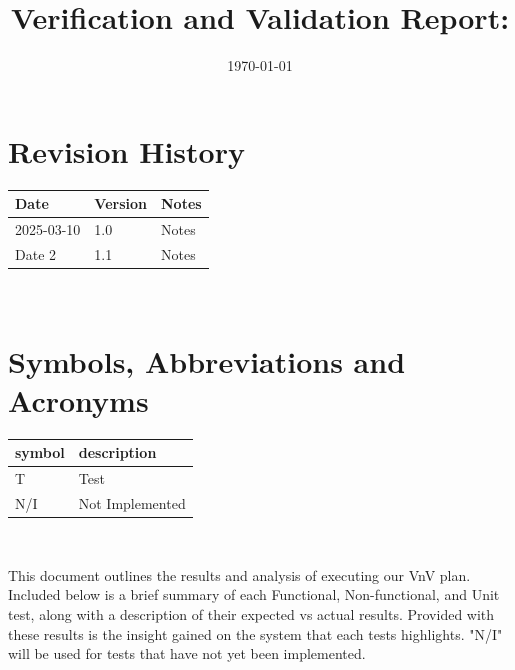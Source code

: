 \documentclass[12pt, titlepage]{article}
\begin{document}
\title{Verification and Validation Report: \progname} 
\author{\authname}
\date{\today}
	
\maketitle


\section{Revision History}

\begin{tabularx}{\textwidth}{p{3cm}p{2cm}X}
\toprule {\bf Date} & {\bf Version} & {\bf Notes}\\
\midrule
2025-03-10 & 1.0 & Notes\\
Date 2 & 1.1 & Notes\\
\bottomrule
\end{tabularx}

~\newpage

\section{Symbols, Abbreviations and Acronyms}

\renewcommand{\arraystretch}{1.2}
\begin{tabular}{l l} 
  \toprule		
  \textbf{symbol} & \textbf{description}\\
  \midrule 
  T & Test\\
  N/I & Not Implemented\\
  \bottomrule
\end{tabular}\\

\newpage

\tableofcontents

\listoftables %

\listoffigures %

\newpage


This document outlines the results and analysis of executing our VnV plan. Included below is a brief summary of each Functional, Non-functional, and Unit test, along with a description of their expected vs actual results. Provided with these results is the insight gained on the system that each tests highlights. "N/I" will be used for tests that have not yet been implemented.  
\end{document}
